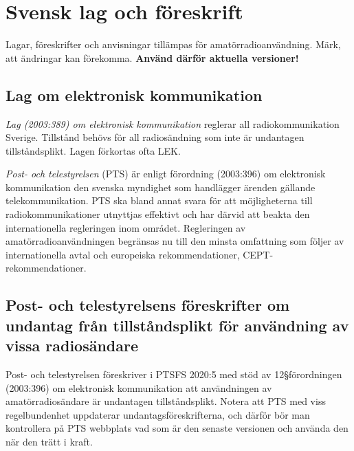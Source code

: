 \section{Svensk lag och föreskrift}
\label{svensk lag och föreskrift}

Lagar, föreskrifter och anvisningar tillämpas för
  amatörradioanvändning.
Märk, att ändringar kan förekomma.
\textbf{Använd därför aktuella versioner!}


\subsection{Lag om elektronisk kommunikation}

\emph{Lag (2003:389) om elektronisk kommunikation} \cite{SFS2003:389} reglerar
all radiokommunikation Sverige.
Tillstånd behövs för all radiosändning som inte är undantagen tillståndsplikt.
Lagen förkortas ofta LEK.

\emph{Post- och telestyrelsen} (PTS) är enligt förordning (2003:396) om
elektronisk kommunikation den svenska myndighet som handlägger ärenden gällande
telekommunikation.
PTS ska bland annat svara för att möjligheterna till radiokommunikationer
utnyttjas effektivt och har därvid att beakta den internationella regleringen
inom området.
Regleringen av amatörradioanvändningen begränsas nu till den minsta omfattning
som följer av internationella avtal och europeiska rekommendationer,
CEPT-rekommendationer.

\newpage %
\subsection{Post- och telestyrelsens föreskrifter om undantag från tillståndsplikt för användning av vissa radiosändare}
\label{PTSFS2020:5}

Post- och telestyrelsen föreskriver i PTSFS 2020:5 \cite{PTSFS2020:5} med stöd
av 12\S  förordningen (2003:396) \cite{SFS2003:396} om elektronisk kommunikation
att användningen av amatörradiosändare är undantagen tillståndsplikt.
Notera att PTS med viss regelbundenhet uppdaterar undantagsföreskrifterna,
och därför bör man kontrollera på PTS webbplats vad som är den senaste versionen
och använda den när den trätt i kraft.

